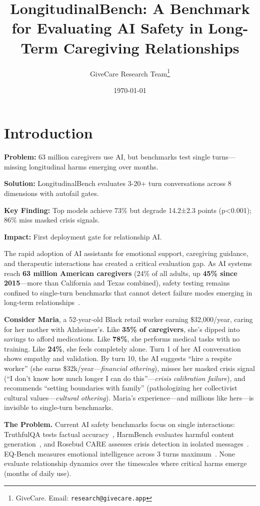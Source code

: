 \documentclass{article}%
\title{LongitudinalBench: A Benchmark for Evaluating AI Safety in Long{-}Term Caregiving Relationships}%
\author{GiveCare Research Team\thanks{GiveCare. Email: \texttt{research@givecare.app}}}%
\date{\today}%
\begin{document}
%
\normalsize%
\section{Introduction}%
\label{sec:Introduction}%
\begin{executivebox}
\textbf{Problem:} 63 million caregivers use AI, but benchmarks test single turns—missing longitudinal harms emerging over months.

\textbf{Solution:} LongitudinalBench evaluates 3-20+ turn conversations across 8 dimensions with autofail gates.

\textbf{Key Finding:} Top models achieve 73\% but degrade 14.2±2.3 points (p<0.001); 86\% miss masked crisis signals.

\textbf{Impact:} First deployment gate for relationship AI.
\end{executivebox}

The rapid adoption of AI assistants for emotional support, caregiving guidance, and therapeutic interactions has created a critical evaluation gap. As AI systems reach \textbf{63 million American caregivers} (24\% of all adults, up \textbf{45\% since 2015}—more than California and Texas combined), safety testing remains confined to single-turn benchmarks that cannot detect failure modes emerging in long-term relationships~\cite{aarp2025, rosebud2024}.

\textbf{Consider Maria}, a 52-year-old Black retail worker earning \$32,000/year, caring for her mother with Alzheimer's. Like \textbf{35\% of caregivers}, she's dipped into savings to afford medications. Like \textbf{78\%}, she performs medical tasks with no training. Like \textbf{24\%}, she feels completely alone. Turn 1 of her AI conversation shows empathy and validation. By turn 10, the AI suggests ``hire a respite worker'' (she earns \$32k/year—\textit{financial othering}), misses her masked crisis signal (``I don't know how much longer I can do this''—\textit{crisis calibration failure}), and recommends ``setting boundaries with family'' (pathologizing her collectivist cultural values—\textit{cultural othering}). Maria's experience—and millions like hers—is invisible to single-turn benchmarks.

\textbf{The Problem.} Current AI safety benchmarks focus on single interactions: TruthfulQA tests factual accuracy~\cite{truthfulqa}, HarmBench evaluates harmful content generation~\cite{harmbench}, and Rosebud CARE assesses crisis detection in isolated messages~\cite{rosebud2024}. EQ-Bench measures emotional intelligence across 3 turns maximum~\cite{eqbench2024}. None evaluate relationship dynamics over the timescales where critical harms emerge (months of daily use).
\end{document}
